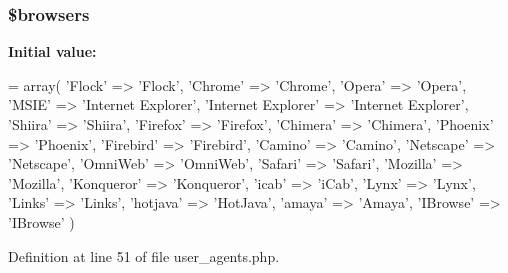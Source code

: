 \subsubsection[{\texorpdfstring{\$browsers}{$browsers}}]{\setlength{\rightskip}{0pt plus 5cm}\$browsers}\hypertarget{user__agents_8php_a81edf933083b5ac5b380385f59074a7d}{}\label{user__agents_8php_a81edf933083b5ac5b380385f59074a7d}
{\bfseries Initial value\+:}
\begin{DoxyCode}
= array(
    \textcolor{stringliteral}{'Flock'} => \textcolor{stringliteral}{'Flock'},
    \textcolor{stringliteral}{'Chrome'} => \textcolor{stringliteral}{'Chrome'},
    \textcolor{stringliteral}{'Opera'} => \textcolor{stringliteral}{'Opera'},
    \textcolor{stringliteral}{'MSIE'} => \textcolor{stringliteral}{'Internet Explorer'},
    \textcolor{stringliteral}{'Internet Explorer'} => \textcolor{stringliteral}{'Internet Explorer'},
    \textcolor{stringliteral}{'Shiira'} => \textcolor{stringliteral}{'Shiira'},
    \textcolor{stringliteral}{'Firefox'} => \textcolor{stringliteral}{'Firefox'},
    \textcolor{stringliteral}{'Chimera'} => \textcolor{stringliteral}{'Chimera'},
    \textcolor{stringliteral}{'Phoenix'} => \textcolor{stringliteral}{'Phoenix'},
    \textcolor{stringliteral}{'Firebird'} => \textcolor{stringliteral}{'Firebird'},
    \textcolor{stringliteral}{'Camino'} => \textcolor{stringliteral}{'Camino'},
    \textcolor{stringliteral}{'Netscape'} => \textcolor{stringliteral}{'Netscape'},
    \textcolor{stringliteral}{'OmniWeb'} => \textcolor{stringliteral}{'OmniWeb'},
    \textcolor{stringliteral}{'Safari'} => \textcolor{stringliteral}{'Safari'},
    \textcolor{stringliteral}{'Mozilla'} => \textcolor{stringliteral}{'Mozilla'},
    \textcolor{stringliteral}{'Konqueror'} => \textcolor{stringliteral}{'Konqueror'},
    \textcolor{stringliteral}{'icab'} => \textcolor{stringliteral}{'iCab'},
    \textcolor{stringliteral}{'Lynx'} => \textcolor{stringliteral}{'Lynx'},
    \textcolor{stringliteral}{'Links'} => \textcolor{stringliteral}{'Links'},
    \textcolor{stringliteral}{'hotjava'} => \textcolor{stringliteral}{'HotJava'},
    \textcolor{stringliteral}{'amaya'} => \textcolor{stringliteral}{'Amaya'},
    \textcolor{stringliteral}{'IBrowse'} => \textcolor{stringliteral}{'IBrowse'}
)
\end{DoxyCode}


Definition at line 51 of file user\+\_\+agents.\+php.

